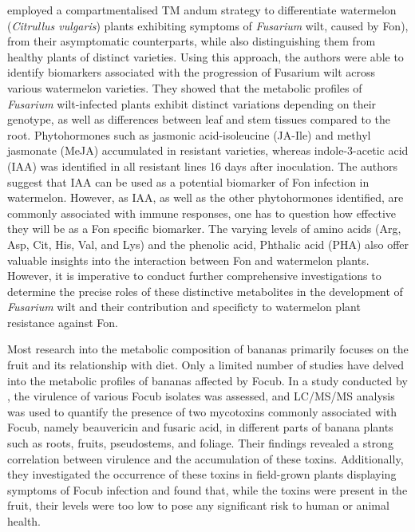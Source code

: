 \textcite{Kasote2020} employed a compartmentalised TM and\ac{um} strategy to differentiate watermelon (\textit{Citrullus vulgaris}) plants exhibiting symptoms of \textit{Fusarium} wilt, caused by \ac{Fon}), from their asymptomatic counterparts, while also distinguishing them from healthy plants of distinct varieties. Using this approach, the authors were able to identify biomarkers associated with the progression of Fusarium wilt across various watermelon varieties. They showed that the metabolic profiles of \textit{Fusarium} wilt-infected plants exhibit distinct variations depending on their genotype, as well as differences between leaf and stem tissues compared to the root. Phytohormones such as jasmonic acid-isoleucine (JA-Ile) and methyl jasmonate (MeJA) accumulated in resistant varieties, whereas indole-3-acetic acid (IAA) was identified in all resistant lines 16 days after inoculation. The authors suggest that IAA can be used as a potential biomarker of \ac{Fon} infection in watermelon. However, as IAA, as well as the other phytohormones identified,  are commonly associated with immune responses, one has to question how effective they will be as a \ac{Fon} specific biomarker. The varying levels of amino acids (Arg, Asp, Cit, His, Val, and Lys) and the phenolic acid, Phthalic acid (PHA) also offer valuable insights into the interaction between \ac{Fon} and watermelon plants. However, it is imperative to conduct further comprehensive investigations to determine the precise roles of these distinctive metabolites in the development of \textit{Fusarium} wilt and their contribution and specificty to watermelon plant resistance against \ac{Fon}.

Most research into the metabolic composition of bananas primarily focuses on the fruit and its relationship with diet. Only a limited number of studies have delved into the metabolic profiles of bananas affected by \ac{Focub}. In a study conducted by \textcite{Li2013c}, the virulence of various \ac{Focub} isolates was assessed, and LC/MS/MS analysis was used to quantify the presence of two mycotoxins commonly associated with \ac{Focub}, namely beauvericin and fusaric acid, in different parts of banana plants such as roots, fruits, pseudostems, and foliage. Their findings revealed a strong correlation between virulence and the accumulation of these toxins. Additionally, they investigated the occurrence of these toxins in field-grown plants displaying symptoms of \ac{Focub} infection and found that, while the toxins were present in the fruit, their levels were too low to pose any significant risk to human or animal health.

